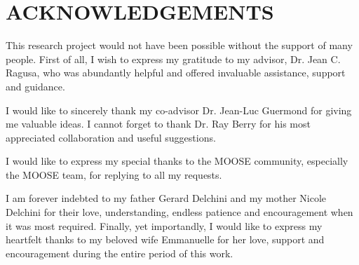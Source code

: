 %
%
%


\chapter*{ACKNOWLEDGEMENTS}


\indent This research project would not have been possible without the support of many people. First of all, I wish to express my gratitude to my advisor, Dr. Jean C. Ragusa, who was abundantly helpful and offered invaluable assistance, support and guidance. 

I would like to sincerely thank my co-advisor Dr. Jean-Luc Guermond for giving me valuable ideas. I cannot forget to thank Dr. Ray Berry for his most appreciated collaboration and useful suggestions.

I would like to express my special thanks to the MOOSE community, especially the MOOSE team, for replying to all my requests.

I am forever indebted to my father Gerard Delchini and my mother Nicole Delchini for their love, understanding, endless patience and encouragement when it was most required. Finally, yet importandly, I would like to express my heartfelt thanks to my beloved wife Emmanuelle for her love, support and encouragement during the entire period of this work.
\pagebreak{}